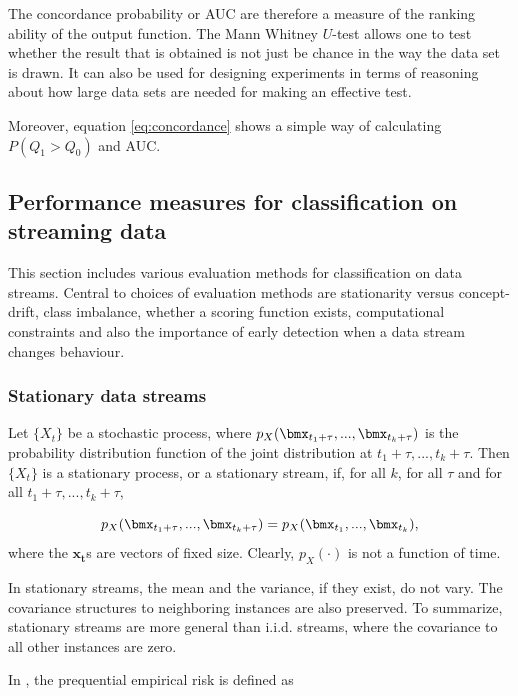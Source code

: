 The concordance probability or AUC are therefore a measure of the ranking ability of the output function.  The Mann Whitney $U$-test allows one to test whether the result that is obtained is not just be chance in the way the data set is drawn.  It can also be used for designing experiments in terms of reasoning about how large data sets are needed for making an effective test.

Moreover, equation \eqref{eq:concordance} shows a simple way of calculating $P(Q_1 > Q_0)$ and AUC.


\subsection{Performance measures for classification on streaming data}
\label{sec:stream}

This section includes various evaluation methods for classification on data streams.  Central to choices of evaluation methods are stationarity versus concept-drift, class imbalance, whether a scoring function exists, computational constraints and also the importance of early detection when a data stream changes behaviour.

\subsubsection{Stationary data streams}

Let $\{X_{t}\}$ be a stochastic process, where $p_X(\bmx_{t_1 + \tau},...,\bmx_{t_k + \tau} )$ is the probability distribution function of the joint distribution at $t_1 + \tau,...,t_k + \tau$.  Then $\{X_t\}$ is a stationary process, or a stationary stream, if, for all $k$, for all $\tau$ and for all $t_1 + \tau,...,t_k + \tau$, 

\begin{equation}
\label{eq:stationarity}
p_X(\bmx_{t_1 + \tau},...,\bmx_{t_k + \tau} ) = p_X(\bmx_{t_1},...,\bmx_{t_k} ),
\end{equation}
where the $\bm{x_t}$s are vectors of fixed size.  Clearly, $p_X(\cdot)$ is not a function of time.  

In stationary streams, the mean and the variance, if they exist, do not vary.  The covariance structures to neighboring instances are also preserved.  To summarize, stationary streams are more general than i.i.d. streams, where the covariance to all other instances are zero.  

In \cite{Gam13}, the prequential empirical risk is defined as 

